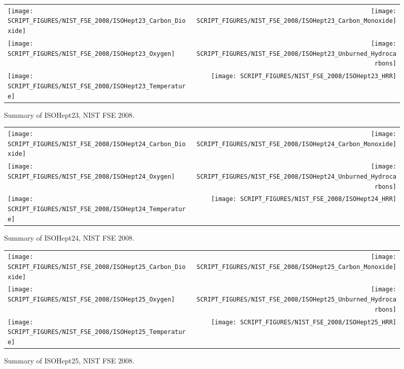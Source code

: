 \begin{figure}[p]
\begin{tabular*}{\textwidth}{l@{\extracolsep{\fill}}r}
\texttt{[image: SCRIPT\_FIGURES/NIST\_FSE\_2008/ISOHept23\_Carbon\_Dioxide]} &
\texttt{[image: SCRIPT\_FIGURES/NIST\_FSE\_2008/ISOHept23\_Carbon\_Monoxide]} \\
\texttt{[image: SCRIPT\_FIGURES/NIST\_FSE\_2008/ISOHept23\_Oxygen]} &
\texttt{[image: SCRIPT\_FIGURES/NIST\_FSE\_2008/ISOHept23\_Unburned\_Hydrocarbons]} \\
\texttt{[image: SCRIPT\_FIGURES/NIST\_FSE\_2008/ISOHept23\_Temperature]} &
\texttt{[image: SCRIPT\_FIGURES/NIST\_FSE\_2008/ISOHept23\_HRR]}
\end{tabular*}
\caption[Summary of ISOHept23, NIST FSE 2008]{Summary of ISOHept23, NIST FSE 2008.}
\label{NIST_FSE_1994_ISOHept23}
\end{figure}

\begin{figure}[p]
\begin{tabular*}{\textwidth}{l@{\extracolsep{\fill}}r}
\texttt{[image: SCRIPT\_FIGURES/NIST\_FSE\_2008/ISOHept24\_Carbon\_Dioxide]} &
\texttt{[image: SCRIPT\_FIGURES/NIST\_FSE\_2008/ISOHept24\_Carbon\_Monoxide]} \\
\texttt{[image: SCRIPT\_FIGURES/NIST\_FSE\_2008/ISOHept24\_Oxygen]} &
\texttt{[image: SCRIPT\_FIGURES/NIST\_FSE\_2008/ISOHept24\_Unburned\_Hydrocarbons]} \\
\texttt{[image: SCRIPT\_FIGURES/NIST\_FSE\_2008/ISOHept24\_Temperature]} &
\texttt{[image: SCRIPT\_FIGURES/NIST\_FSE\_2008/ISOHept24\_HRR]}
\end{tabular*}
\caption[Summary of ISOHept24, NIST FSE 2008]{Summary of ISOHept24, NIST FSE 2008.}
\label{NIST_FSE_1994_ISOHept24}
\end{figure}

\begin{figure}[p]
\begin{tabular*}{\textwidth}{l@{\extracolsep{\fill}}r}
\texttt{[image: SCRIPT\_FIGURES/NIST\_FSE\_2008/ISOHept25\_Carbon\_Dioxide]} &
\texttt{[image: SCRIPT\_FIGURES/NIST\_FSE\_2008/ISOHept25\_Carbon\_Monoxide]} \\
\texttt{[image: SCRIPT\_FIGURES/NIST\_FSE\_2008/ISOHept25\_Oxygen]} &
\texttt{[image: SCRIPT\_FIGURES/NIST\_FSE\_2008/ISOHept25\_Unburned\_Hydrocarbons]} \\
\texttt{[image: SCRIPT\_FIGURES/NIST\_FSE\_2008/ISOHept25\_Temperature]} &
\texttt{[image: SCRIPT\_FIGURES/NIST\_FSE\_2008/ISOHept25\_HRR]}
\end{tabular*}
\caption[Summary of ISOHept25, NIST FSE 2008]{Summary of ISOHept25, NIST FSE 2008.}
\label{NIST_FSE_1994_ISOHept25}
\end{figure}

